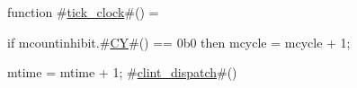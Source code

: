 function #\hyperref[sailRISCVztickzyclock]{tick\_clock}#() = {
  if   mcountinhibit.#\hyperref[sailRISCVzCY]{CY}#() == 0b0
  then mcycle = mcycle + 1;

  mtime  = mtime  + 1;
  #\hyperref[sailRISCVzclintzydispatch]{clint\_dispatch}#()
}
